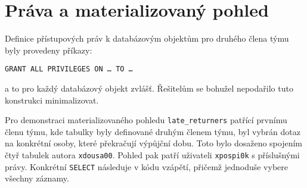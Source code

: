 \documentclass{article}
\begin{document}
\section{Práva a materializovaný pohled}
Definice přístupových práv k databázovým objektům pro druhého člena týmu byly provedeny příkazy:

\medskip
\noindent
\texttt{GRANT~ALL~PRIVILEGES~ON~\dots~TO~\dots}

\medskip
\noindent
a to pro každý databázový objekt zvlášť. Řešitelům se bohužel nepodařilo tuto konstrukci minimalizovat. 

Pro demonstraci materializovaného pohledu \texttt{late\_returners} patřící prvnímu členu týmu, kde tabulky byly definované druhým členem týmu, byl vybrán dotaz na konkrétní osoby, které překračují výpůjční dobu. Toto bylo dosaženo spojením čtyř tabulek autora \texttt{xdousa00}. Pohled pak patří uživateli \texttt{xpospi0k} s příslušnými právy. Konkrétní \texttt{SELECT} následuje v kódu vzápětí,  přičemž jednoduše vybere všechny záznamy.
\end{document}
